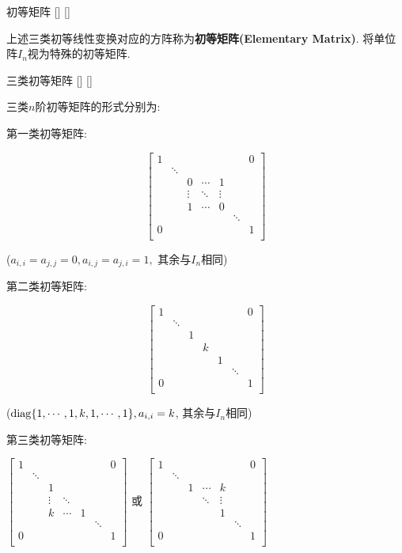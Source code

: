 \documentclass[UTF8]{ctexart}
\begin{document}
		\begin{dfn}
			[]
			{初等矩阵}
			[]
			[]

			上述三类初等线性变换对应的方阵称为\textbf{初等矩阵(Elementary Matrix)}. 将单位阵$I_n$视为特殊的初等矩阵. 
		\end{dfn}
		
		\begin{ppt}
			[]
			{三类初等矩阵}
			[]
			[]

			三类$n$阶初等矩阵的形式分别为: 
			
			第一类初等矩阵: 
			
			$$\begin{bmatrix}
			1 & & & & & & 0\\
			 &\ddots & & & & & \\
			 & & 0 & \cdots & 1 & & \\
			 & &\vdots &\ddots &\vdots & & \\
			 & & 1 & \cdots & 0 & & \\
			 & & & & &\ddots & \\
			0 & & & & & & 1\\
			\end{bmatrix}$$
			
			($a_{i,i}=a_{j,j}=0,a_{i,j}=a_{j,i}=1,$ 其余与$I_n$相同)
			
			第二类初等矩阵: 
			
			$$\begin{bmatrix}
			1 & & & & & & 0\\
			 &\ddots & & & & & \\
			 & & 1 & & & & \\
			 & & & k & & & \\
			 & & & & 1 & & \\
			 & & & & & \ddots & \\
			0 & & & & & & 1\\
			\end{bmatrix}$$
			
			(${\rm diag}\{1,\cdots,1,k,1,\cdots,1\}, a_{i,i}=k$, 其余与$I_n$相同)
			
			第三类初等矩阵: 
			
			$\begin{bmatrix}
			1 & & & & & & 0\\
			 &\ddots & & & & & \\
			 & & 1 & & & & \\
			 & &\vdots &\ddots & & & \\
			 & & k & \cdots & 1 & & \\
			 & & & & &\ddots & \\
			0 & & & & & & 1\\
			\end{bmatrix}$
			或
			$\begin{bmatrix}
			1 & & & & & & 0\\
			 &\ddots & & & & & \\
			 & & 1 & \cdots & k & & \\
			 & & &\ddots & \vdots & & \\
			 & & & & 1 & & \\
			 & & & & &\ddots & \\
			0 & & & & & & 1\\
			\end{bmatrix}$
			

\end{ppt}
\end{document}
